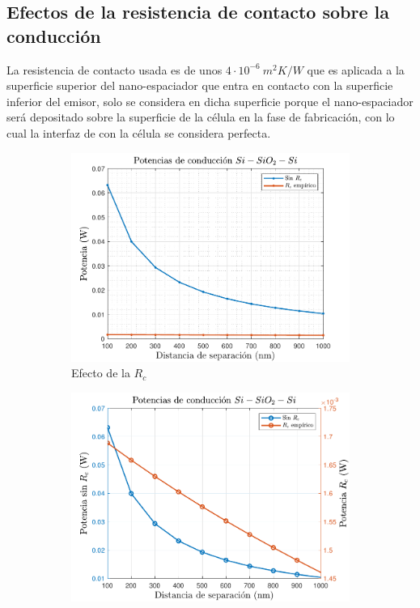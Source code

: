 \subsection{Efectos de la resistencia de contacto sobre la conducción}
La resistencia de contacto usada es de unos $4\cdot 10^{-6} \ m^2 K/W$ \cite{nf_TPV_Pillars_SiO2} que es aplicada a la superficie superior del nano-espaciador que entra en contacto con la superficie inferior del emisor, solo se considera en dicha superficie porque el nano-espaciador será depositado sobre la superficie de la célula en la fase de fabricación, con lo cual la interfaz de con la célula se considera perfecta.
\begin{figure}[H]
	\centering
	\begin{subfigure}[b]{0.49\textwidth}
		\centering
		\includegraphics[width=1.0\textwidth]{figuras/Resultados/conduccion/pdf/Prc_SiSiO2Si.pdf}
		\caption{Efecto de la $R_c$}
		\label{fig:Prc_SiSiO2Si}
	\end{subfigure}
	\hfill
	\begin{subfigure}[b]{0.49\textwidth}
		\centering
		\includegraphics[width=1.0\textwidth]{figuras/Resultados/conduccion/pdf/Prc2_SiSiO2Si.pdf}

\end{subfigure}
\end{figure}
